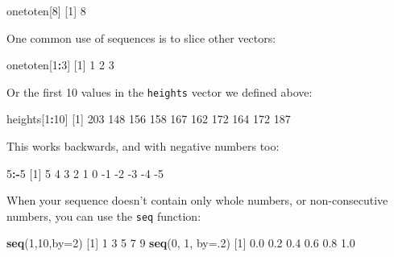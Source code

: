 \documentclass[]{article}
\newenvironment{Shaded}{\begin{snugshade}}{\end{snugshade}}
\newcommand{\DataTypeTok}[1]{\textcolor[rgb]{0.13,0.29,0.53}{#1}}
\newcommand{\DecValTok}[1]{\textcolor[rgb]{0.00,0.00,0.81}{#1}}
\newcommand{\FloatTok}[1]{\textcolor[rgb]{0.00,0.00,0.81}{#1}}
\newcommand{\KeywordTok}[1]{\textcolor[rgb]{0.13,0.29,0.53}{\textbf{#1}}}
\newcommand{\NormalTok}[1]{#1}
\newcommand{\OperatorTok}[1]{\textcolor[rgb]{0.81,0.36,0.00}{\textbf{#1}}}
\begin{document}
\begin{Shaded}
\begin{Highlighting}[]
\NormalTok{onetoten[}\DecValTok{8}\NormalTok{]}
\NormalTok{[}\DecValTok{1}\NormalTok{] }\DecValTok{8}
\end{Highlighting}
\end{Shaded}

One common use of sequences is to slice other vectors:

\begin{Shaded}
\begin{Highlighting}[]
\NormalTok{onetoten[}\DecValTok{1}\OperatorTok{:}\DecValTok{3}\NormalTok{]}
\NormalTok{[}\DecValTok{1}\NormalTok{] }\DecValTok{1} \DecValTok{2} \DecValTok{3}
\end{Highlighting}
\end{Shaded}

Or the first 10 values in the \texttt{heights} vector we defined above:

\begin{Shaded}
\begin{Highlighting}[]
\NormalTok{heights[}\DecValTok{1}\OperatorTok{:}\DecValTok{10}\NormalTok{]}
\NormalTok{ [}\DecValTok{1}\NormalTok{] }\DecValTok{203} \DecValTok{148} \DecValTok{156} \DecValTok{158} \DecValTok{167} \DecValTok{162} \DecValTok{172} \DecValTok{164} \DecValTok{172} \DecValTok{187}
\end{Highlighting}
\end{Shaded}

This works backwards, and with negative numbers too:

\begin{Shaded}
\begin{Highlighting}[]
\DecValTok{5}\OperatorTok{:-}\DecValTok{5}
\NormalTok{ [}\DecValTok{1}\NormalTok{]  }\DecValTok{5}  \DecValTok{4}  \DecValTok{3}  \DecValTok{2}  \DecValTok{1}  \DecValTok{0} \DecValTok{-1} \DecValTok{-2} \DecValTok{-3} \DecValTok{-4} \DecValTok{-5}
\end{Highlighting}
\end{Shaded}

When your sequence doesn't contain only whole numbers, or non-consecutive
numbers, you can use the \texttt{seq} function:

\begin{Shaded}
\begin{Highlighting}[]
\KeywordTok{seq}\NormalTok{(}\DecValTok{1}\NormalTok{,}\DecValTok{10}\NormalTok{,}\DataTypeTok{by=}\DecValTok{2}\NormalTok{)}
\NormalTok{[}\DecValTok{1}\NormalTok{] }\DecValTok{1} \DecValTok{3} \DecValTok{5} \DecValTok{7} \DecValTok{9}
\KeywordTok{seq}\NormalTok{(}\DecValTok{0}\NormalTok{, }\DecValTok{1}\NormalTok{, }\DataTypeTok{by=}\NormalTok{.}\DecValTok{2}\NormalTok{)}
\NormalTok{[}\DecValTok{1}\NormalTok{] }\FloatTok{0.0} \FloatTok{0.2} \FloatTok{0.4} \FloatTok{0.6} \FloatTok{0.8} \FloatTok{1.0}
\end{Highlighting}
\end{Shaded}
\end{document}
